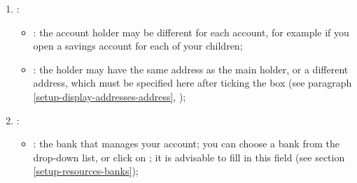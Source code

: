 \begin{enumerate}
\begin{itemize}
		\item {}: for more details, see section \vref{accounts-type};
		\item {}: the currency in which transactions for this account are denominated (see sections \vref{setup-resources-currencies} and \vref{setup-resources-rate});
		\item {}: checkbox that allows you to hide the account in the navigation panel and in the information bar, without deleting it; it can be displayed again by clicking on the  menu;
	\end{itemize}
	\item {}:
	\begin{itemize}
		\item {}: the account holder may be different for each account, for example if you open a savings account for each of your children;
		\item {}: the holder may have the same address as the main holder, or a different address, which must be specified here after ticking the box  (see paragraph \vref{setup-display-addresses-address}, );
	\end{itemize}
	\item {}:
	\begin{itemize}
		\item {}: the bank that manages your account; you can choose a bank from the drop-down list, or click on ; it is advisable to fill in this field (see section \vref{setup-resources-banks});

\end{itemize}
\end{enumerate}
